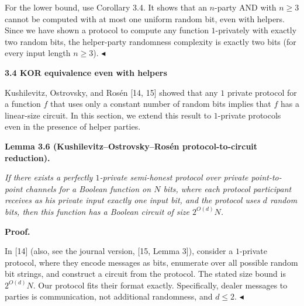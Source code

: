 \documentclass[10pt,a4paper]{article}
\begin{document}
For the lower bound, use Corollary 3.4. It shows that an $n$-party AND with $n\geq 3$ cannot be computed with at most one uniform random bit, even with helpers. Since we have shown a protocol to compute any function $1$-privately with exactly two random bits, the helper-party randomness complexity is exactly two bits (for every input length $n\geq 3$).
$\blacktriangleleft$\par






\par\medskip\noindent\textbf{
3.4 KOR equivalence even with helpers}\par




Kushilevitz, Ostrovsky, and Rosén [14, 15] showed that any $1$ private protocol for a function $f$ that uses only a constant number of random bits implies that $f$ has a linear-size circuit. In this section, we extend this result to $1$-private protocols even in the presence of helper parties.\par





\par\medskip\noindent\textbf{
\textbf{Lemma 3.6}\textbf{ }(Kushilevitz–Ostrovsky–Rosén protocol-to-circuit reduction)\textbf{.}
}\par



\emph{If there exists a perfectly $1$-private semi-honest protocol over private point-to-point channels for a Boolean function on $N$ bits, where each protocol participant receives as his private input exactly one input bit, and the protocol uses $d$ random bits, then this function has a Boolean circuit of size $2^{O(d)}N$.}\par






\par\medskip\noindent\textbf{Proof.}\par




In [14] (also, see the journal version, [15, Lemma 3]), consider a $1$-private protocol, where they encode messages as bits, enumerate over all possible random bit strings, and construct a circuit from the protocol. The stated size bound is $2^{O(d)}N$. Our protocol fits their format exactly. Specifically, dealer messages to parties is communication, not additional randomness, and $d\leq 2$.
$\blacktriangleleft$\par
\end{document}
